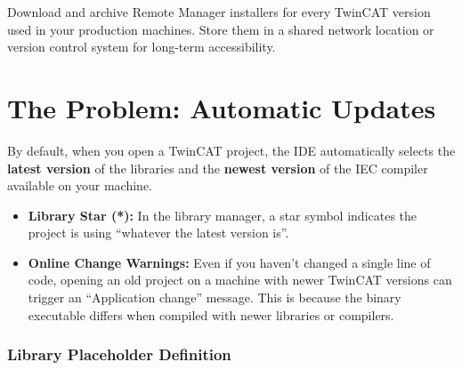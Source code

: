 \documentclass[11pt,a4paper]{article}
\begin{document}
\begin{tipbox}
Download and archive Remote Manager installers for every TwinCAT version used in your production machines. Store them in a shared network location or version control system for long-term accessibility.
\end{tipbox}

\section{The Problem: Automatic Updates}

By default, when you open a TwinCAT project, the IDE automatically selects the \textbf{latest version} of the libraries and the \textbf{newest version} of the IEC compiler available on your machine.

\begin{itemize}[leftmargin=*]
    \item \textbf{Library Star (*):} In the library manager, a star symbol indicates the project is using ``whatever the latest version is''.
    \item \textbf{Online Change Warnings:} Even if you haven't changed a single line of code, opening an old project on a machine with newer TwinCAT versions can trigger an ``Application change'' message. This is because the binary executable differs when compiled with newer libraries or compilers.
\end{itemize}

\subsubsection*{Library Placeholder Definition}
\end{document}
